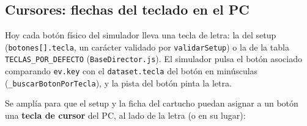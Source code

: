 \subsection{Cursores: flechas del teclado en el PC}
\label{sec:F5I17Flechas}

Hoy cada botón físico del simulador lleva una tecla de letra: la del setup (\texttt{botones[].tecla}, un carácter validado por \texttt{validarSetup}) o la de la tabla \texttt{TECLAS\_POR\_DEFECTO} (\texttt{BaseDirector.js}). El simulador pulsa el botón asociado comparando \texttt{ev.key} con el \texttt{dataset.tecla} del botón en minúsculas (\texttt{\_buscarBotonPorTecla}), y la pista del botón pinta la letra.

Se amplía para que el setup y la ficha del cartucho puedan asignar a un botón una \textbf{tecla de cursor} del PC, al lado de la letra (o en su lugar):


